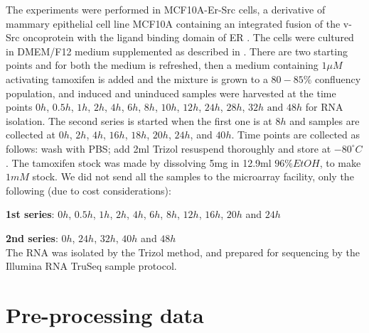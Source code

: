 The experiments were performed in MCF10A-Er-Src cells, a derivative of mammary epithelial cell line MCF10A containing an integrated fusion of the v-Src oncoprotein with the ligand binding domain of ER \citep{Hirsch:2010ec,Iliopoulos:2009do}. The cells were cultured in DMEM/F12 medium supplemented as described in \cite{Debnath:2003km}. There are two starting points and for both the medium is refreshed, then a medium containing $1 \mu M$ activating tamoxifen is added and the mixture is grown to a $80 - 85\%$ confluency population, and induced and uninduced samples were harvested at the time points $ 0h$, $ 0.5h$, $ 1h$, $ 2h$, $ 4h$, $ 6h$, $ 8h$, $ 10h$, $ 12h$, $ 24h$, $ 28h$, $ 32h \text{ and } 48h$ for RNA isolation. The second series is started when the first one is at $8h$ and samples are collected at $0h$, $2h$, $4h$, $16h$, $18h$, $20h$, $24h$, and $40h$. Time points are collected as follows: wash with PBS; add 2ml Trizol resuspend thoroughly and store at $-80^{\circ}C$. The tamoxifen stock was made by dissolving 5mg in 12.9ml $96\% EtOH $, to make $ 1mM$ stock. We did not send all the samples to the microarray facility, only the following (due to cost considerations):

\textbf{1st series}: $0h$, $0.5h$, $1h$, $2h$, $4h$, $6h$, $8h$, $12h$, $16h$, $20h$ and $24h$

\textbf{2nd series}: $0h$, $24h$, $32h$, $40h$ and $48h$ \\
The RNA was isolated by the Trizol method, and prepared for sequencing by the Illumina RNA TruSeq sample protocol.


\section{Pre-processing data}
\label{sec:norm-stand}

